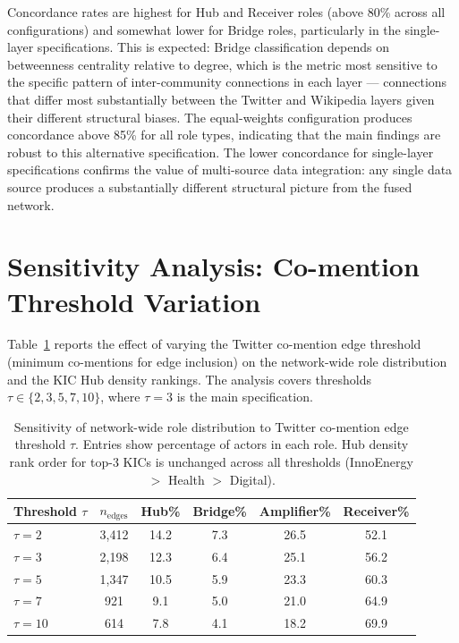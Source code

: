 \documentclass[review,12pt]{elsarticle}
\begin{document}
Concordance rates are highest for Hub and Receiver roles (above 80\% across all configurations) and somewhat lower for Bridge roles, particularly in the single-layer specifications. This is expected: Bridge classification depends on betweenness centrality relative to degree, which is the metric most sensitive to the specific pattern of inter-community connections in each layer --- connections that differ most substantially between the Twitter and Wikipedia layers given their different structural biases. The equal-weights configuration produces concordance above 85\% for all role types, indicating that the main findings are robust to this alternative specification. The lower concordance for single-layer specifications confirms the value of multi-source data integration: any single data source produces a substantially different structural picture from the fused network.

\section{Sensitivity Analysis: Co-mention Threshold Variation}
\label{app:threshold}

Table~\ref{tab:threshold-sensitivity} reports the effect of varying the Twitter co-mention edge threshold (minimum co-mentions for edge inclusion) on the network-wide role distribution and the KIC Hub density rankings. The analysis covers thresholds $\tau \in \{2, 3, 5, 7, 10\}$, where $\tau = 3$ is the main specification.

\begin{table}[htbp]
\centering
\caption{Sensitivity of network-wide role distribution to Twitter co-mention edge threshold $\tau$.
Entries show percentage of actors in each role. Hub density rank order for top-3 KICs is unchanged across all thresholds (InnoEnergy $>$ Health $>$ Digital).}
\label{tab:threshold-sensitivity}
\small
\begin{tabular}{@{}lccccc@{}}
\toprule
\textbf{Threshold $\tau$} & \textbf{$n_{\text{edges}}$} & \textbf{Hub\%} &
  \textbf{Bridge\%} & \textbf{Amplifier\%} & \textbf{Receiver\%} \\
\midrule
$\tau = 2$  & 3{,}412 & 14.2 & 7.3 & 26.5 & 52.1 \\
$\tau = 3$  & 2{,}198 & 12.3 & 6.4 & 25.1 & 56.2 \\
$\tau = 5$  & 1{,}347 & 10.5 & 5.9 & 23.3 & 60.3 \\
$\tau = 7$  &   921  &  9.1 & 5.0 & 21.0 & 64.9 \\
$\tau = 10$ &   614  &  7.8 & 4.1 & 18.2 & 69.9 \\
\bottomrule
\end{tabular}
\end{table}
\end{document}
